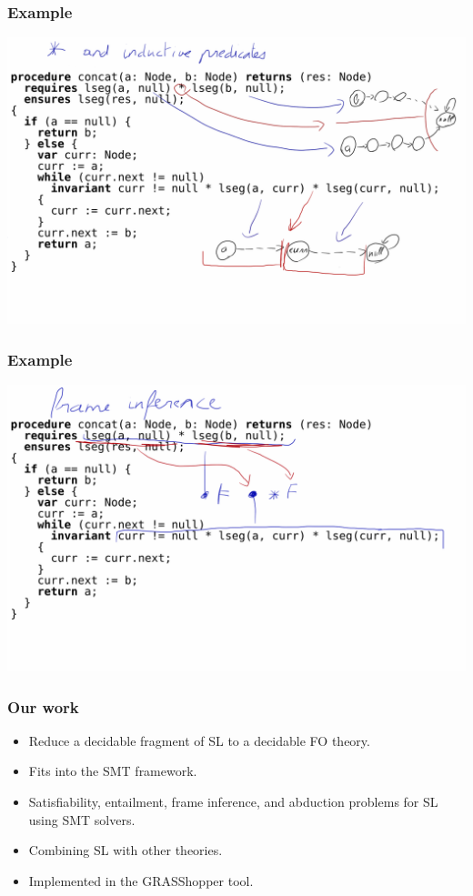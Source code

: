 \documentclass{beamer}
\begin{document}
\begin{frame}
  \frametitle{Example}
  \includegraphics[scale=0.23]{resources/star.png}
\end{frame}

\begin{frame}
  \frametitle{Example}
  \includegraphics[scale=0.23]{resources/frame.png}
\end{frame}

\begin{frame}
  \frametitle{Our work}

  \begin{itemize}
  \item Reduce a decidable fragment of SL to a decidable FO theory.
  \item Fits into the SMT framework.
  \item Satisfiability, entailment, frame inference, and abduction problems for SL using SMT solvers.
  \item Combining SL with other theories.
  \item Implemented in the GRASShopper tool.
  \end{itemize}

\end{frame}
\end{document}
